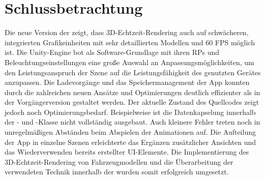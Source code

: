 \chapter{Schlussbetrachtung}
\label{ch:conclusion}
Die neue Version der \mapp zeigt, dass 3D-Echtzeit-Rendering auch auf schwächeren, integrierten Grafikeinheiten mit sehr detaillierten Modellen und 60 \acs{FPS} möglich ist. Die Unity-Engine bot als Software-Grundlage mit ihren \acs{RP}s und Beleuchtungseinstellungen eine große Auswahl an Anpassungsmöglichkeiten, um den Leistungsanspruch der Szene auf die Leistungsfähigkeit des genutzten Gerätes anzupassen. Die Ladevorgänge und das Speichermanagement der App konnten durch die zahlreichen neuen Ansätze und Optimierungen deutlich effizienter als in der Vorgängerversion gestaltet werden. Der aktuelle Zustand des Quellcodes zeigt jedoch noch Optimierungsbedarf. Beispielweise ist die Datenkapselung innerhalb der - und -Klasse nicht vollständig ausgebaut. Auch kleinere Fehler treten noch in unregelmäßigen Abständen beim Abspielen der Animationen auf. Die Aufteilung der App in einzelne Szenen erleichterte das Ergänzen zusätzlicher Ansichten und  das Wiederverwenden bereits erstellter UI-Elemente. Die Implementierung des 3D-Echtzeit-Rendering von Fahrzeugmodellen und die Überarbeitung der verwendeten Technik innerhalb der \mapp wurden somit erfolgreich umgesetzt.
%
